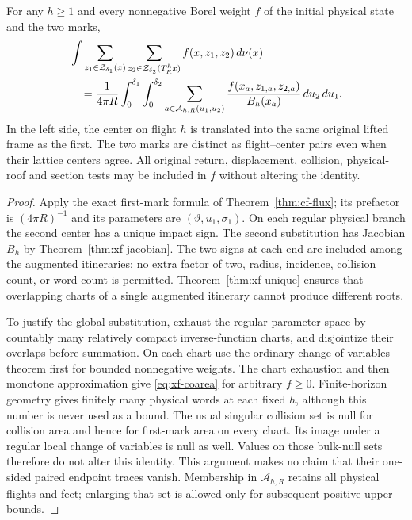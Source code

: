 \begin{theorem}
\label{thm:xf-coarea}
For any $h\ge1$ and every nonnegative Borel weight $f$ of the initial
physical state and the two marks,
\begin{align}
 &\int \sum_{z_1\in\mathcal Z_{\delta_1}(x)}
          \sum_{z_2\in\mathcal Z_{\delta_2}(T_R^hx)}
                  f(x,z_1,z_2)\,d\nu(x)\notag\\
 &\quad=\frac1{4\pi R}\int_0^{\delta_1}\int_0^{\delta_2}
       \sum_{a\in\mathcal A_{h,R}(u_1,u_2)}
                 \frac{f(x_a,z_{1,a},z_{2,a})}{B_h(x_a)}
                                    \,du_2\,du_1.\label{eq:xf-coarea}
\end{align}
In the left side, the center on flight $h$ is translated into the
same original lifted frame as the first. The two marks are distinct
as flight--center pairs even when their lattice centers agree.
All original return, displacement, collision, physical-roof and
section tests may be included in $f$ without altering the identity.
\end{theorem}
\begin{proof}
Apply the exact first-mark formula of Theorem~\ref{thm:cf-flux};
its prefactor is $(4\pi R)^{-1}$ and its parameters are
$(\vartheta,u_1,\sigma_1)$. On each regular physical branch the
second center has a unique impact sign. The second substitution has
Jacobian $B_h$ by Theorem~\ref{thm:xf-jacobian}. The two signs at
each end are included among the augmented itineraries; no extra
factor of two, radius, incidence, collision count, or word count is
permitted. Theorem~\ref{thm:xf-unique} ensures that overlapping
charts of a single augmented itinerary cannot produce different roots.

To justify the global substitution, exhaust the regular parameter
space by countably many relatively compact inverse-function charts,
and disjointize their overlaps before summation. On each chart use
the ordinary change-of-variables theorem first for bounded
nonnegative weights. The chart exhaustion and then monotone
approximation give \eqref{eq:xf-coarea} for arbitrary $f\ge0$.
Finite-horizon geometry gives finitely many physical words at each
fixed $h$, although this number is never used as a bound. The usual
singular collision set is null for collision area and hence for
first-mark area on every chart. Its image under a regular local
change of variables is null as well. Values on those bulk-null
sets therefore do not alter this identity. This argument makes no
claim that their one-sided paired endpoint traces vanish. Membership
in $\mathcal A_{h,R}$ retains all physical flights and feet; enlarging
that set is allowed only for subsequent positive upper bounds.
\end{proof}
